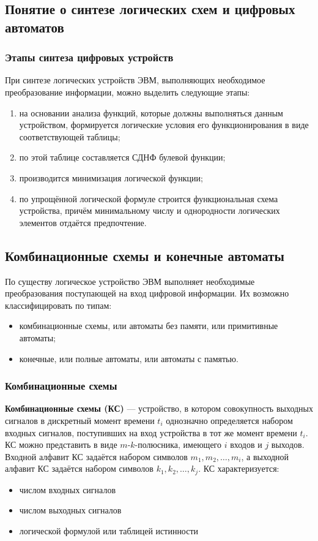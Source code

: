 \documentclass[10pt,a4paper,titlepage]{article}
\begin{document}
\subsection{Понятие о синтезе логических схем и цифровых автоматов}

\subsubsection{Этапы синтеза цифровых устройств}

При синтезе логических устройств ЭВМ, выполняющих необходимое преобразование информации, можно выделить следующие этапы:
\begin{enumerate}
\item на основании анализа функций, которые должны выполняться данным устройством, формируется логические условия его функционирования в виде соответствующей таблицы;
\item по этой таблице составляется СДНФ булевой функции;
\item производится минимизация логической функции;
\item по упрощённой логической формуле строится функциональная схема устройства, причём минимальному числу и однородности логических элементов отдаётся предпочтение.
\end{enumerate}

\subsection{Комбинационные схемы и конечные автоматы}

По существу логическое устройство ЭВМ выполняет необходимые преобразования поступающей на вход цифровой информации.
Их возможно классифицировать по типам:
\begin{itemize}
\item комбинационные схемы, или автоматы без памяти, или примитивные автоматы;
\item конечные, или полные автоматы, или автоматы с памятью.
\end{itemize}

\subsubsection{Комбинационные схемы}

\textbf{Комбинационные схемы (КС)} --- устройство, в котором совокупность выходных сигналов в дискретный момент времени $t_i$ однозначно определяется набором входных сигналов, поступивших на вход устройства в тот же момент времени $t_i$.
КС можно представить в виде $m$-$k$-полюсника, имеющего $i$ входов и $j$ выходов.
Входной алфавит КС задаётся набором символов $m_1, m_2, \dots, m_i$, а выходной алфавит КС задаётся набором символов $k_1, k_2, \dots, k_j$.
КС характеризуется:
\begin{itemize}
\item числом входных сигналов
\item числом выходных сигналов
\item логической формулой или таблицей истинности
\end{itemize}
\end{document}
